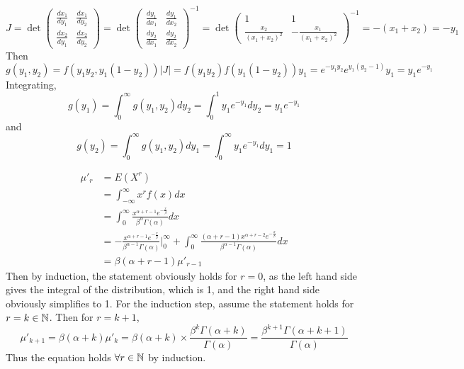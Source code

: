 \documentclass[answers]{exam}
\begin{document}
\begin{questions}
\begin{solution}
	$$J  = \det\begin{pmatrix} \frac{dx_1}{dy_1} & \frac{dx_1}{dy_2} \\ \frac{dx_2}{dy_1} & \frac{dx_2}{dy_2} \end{pmatrix} = \det\begin{pmatrix} \frac{dy_1}{dx_1} & \frac{dy_1}{dx_2} \\ \frac{dy_2}{dx_1} & \frac{dy_2}{dx_2} \end{pmatrix}^{-1} = \det\begin{pmatrix} 1 & 1 \\ \frac{x_2}{(x_1+x_2)^2} & -\frac{x_1}{(x_1+x_2)^2} \end{pmatrix}^{-1} = -(x_1+x_2) = -y_1$$
	Then
	$$g(y_1,y_2) = f(y_1y_2, y_1(1-y_2))|J| = f(y_1y_2)f(y_1(1-y_2))y_1 = e^{-y_1y_2}e^{y_1(y_2-1)}y_1 = y_1e^{-y_1}$$
	Integrating,
	$$g(y_1) = \int_0^\infty g(y_1,y_2)dy_2 = \int_0^1 y_1e^{-y_1}dy_2 = y_1e^{-y_1}$$
	and
	$$g(y_2) = \int_0^\infty g(y_1,y_2)dy_1 = \int_0^\infty y_1e^{-y_1}dy_1 = 1$$
\end{solution}


\begin{solution}
	\begin{align*}
		\mu'_r &= E(X^r) \\
		       &= \int_{-\infty}^\infty x^rf(x)dx \\
		       &= \int_0^\infty \frac{x^{\alpha+r-1}e^{-\frac{x}{\beta}}}{\beta^\alpha\Gamma(\alpha)} dx \\
		       &= -\frac{x^{\alpha+r-1}e^{-\frac{x}{\beta}}}{\beta^{\alpha-1}\Gamma(\alpha)} \Big |_0^\infty + \int_0^\infty \frac{(\alpha+r-1)x^{\alpha+r-2}e^{-\frac{x}{\beta}}}{\beta^{\alpha-1}\Gamma(\alpha)} dx \\
		       &= \beta(\alpha+r-1)\mu'_{r-1}
	\end{align*}
	Then by induction, the statement obviously holds for $r=0$, as the left hand side gives the integral of the distribution, which is 1, and the right hand side obviously simplifies to 1. For the induction step, assume the statement holds for $r=k \in \mathbb{N}$. Then for $r=k+1$,
	$$\mu'_{k+1} = \beta(\alpha+k)\mu'_k = \beta(\alpha+k)\times\frac{\beta^k\Gamma(\alpha+k)}{\Gamma(\alpha)} = \frac{\beta^{k+1}\Gamma(\alpha+k+1)}{\Gamma(\alpha)}$$
	Thus the equation holds $\forall r \in \mathbb{N}$ by induction.
\end{solution}


\end{questions}
\end{document}
